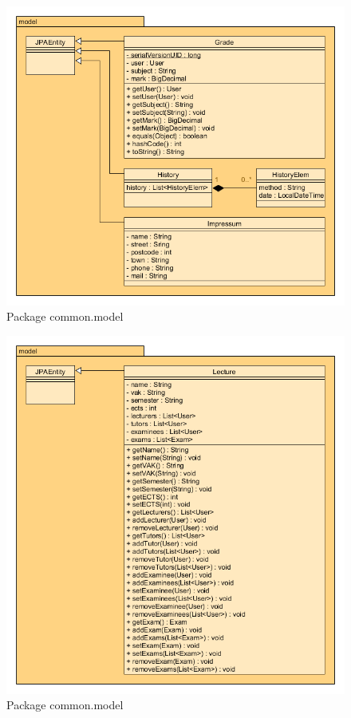 \begin{figure}[H]
	\centering
  \includegraphics[width=\textwidth]{../UMLDiagramme/common/model/gfx/4_package_model_part_3.png}
	\caption{Package common.model}
\end{figure}

\begin{figure}[H]
	\centering
  \includegraphics[width=\textwidth]{../UMLDiagramme/common/model/gfx/4_package_model_part_4.png}
	\caption{Package common.model}
\end{figure}


